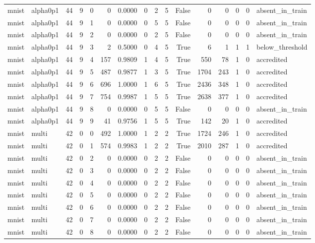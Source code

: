 \begin{tabular}{llrrrrrrrrrrrrrl}
mnist & alpha0p1 & 44 & 9 & 0 & 0 & 0.0000 & 0 & 2 & 5 & False & 0 & 0 & 0 & 0 & absent\_in\_train \\
mnist & alpha0p1 & 44 & 9 & 1 & 0 & 0.0000 & 0 & 5 & 5 & False & 0 & 0 & 0 & 0 & absent\_in\_train \\
mnist & alpha0p1 & 44 & 9 & 2 & 0 & 0.0000 & 0 & 2 & 5 & False & 0 & 0 & 0 & 0 & absent\_in\_train \\
mnist & alpha0p1 & 44 & 9 & 3 & 2 & 0.5000 & 0 & 4 & 5 & True & 6 & 1 & 1 & 1 & below\_threshold \\
mnist & alpha0p1 & 44 & 9 & 4 & 157 & 0.9809 & 1 & 4 & 5 & True & 550 & 78 & 1 & 0 & accredited \\
mnist & alpha0p1 & 44 & 9 & 5 & 487 & 0.9877 & 1 & 3 & 5 & True & 1704 & 243 & 1 & 0 & accredited \\
mnist & alpha0p1 & 44 & 9 & 6 & 696 & 1.0000 & 1 & 6 & 5 & True & 2436 & 348 & 1 & 0 & accredited \\
mnist & alpha0p1 & 44 & 9 & 7 & 754 & 0.9987 & 1 & 5 & 5 & True & 2638 & 377 & 1 & 0 & accredited \\
mnist & alpha0p1 & 44 & 9 & 8 & 0 & 0.0000 & 0 & 5 & 5 & False & 0 & 0 & 0 & 0 & absent\_in\_train \\
mnist & alpha0p1 & 44 & 9 & 9 & 41 & 0.9756 & 1 & 5 & 5 & True & 142 & 20 & 1 & 0 & accredited \\
mnist & multi & 42 & 0 & 0 & 492 & 1.0000 & 1 & 2 & 2 & True & 1724 & 246 & 1 & 0 & accredited \\
mnist & multi & 42 & 0 & 1 & 574 & 0.9983 & 1 & 2 & 2 & True & 2010 & 287 & 1 & 0 & accredited \\
mnist & multi & 42 & 0 & 2 & 0 & 0.0000 & 0 & 2 & 2 & False & 0 & 0 & 0 & 0 & absent\_in\_train \\
mnist & multi & 42 & 0 & 3 & 0 & 0.0000 & 0 & 2 & 2 & False & 0 & 0 & 0 & 0 & absent\_in\_train \\
mnist & multi & 42 & 0 & 4 & 0 & 0.0000 & 0 & 2 & 2 & False & 0 & 0 & 0 & 0 & absent\_in\_train \\
mnist & multi & 42 & 0 & 5 & 0 & 0.0000 & 0 & 2 & 2 & False & 0 & 0 & 0 & 0 & absent\_in\_train \\
mnist & multi & 42 & 0 & 6 & 0 & 0.0000 & 0 & 2 & 2 & False & 0 & 0 & 0 & 0 & absent\_in\_train \\
mnist & multi & 42 & 0 & 7 & 0 & 0.0000 & 0 & 2 & 2 & False & 0 & 0 & 0 & 0 & absent\_in\_train \\
mnist & multi & 42 & 0 & 8 & 0 & 0.0000 & 0 & 2 & 2 & False & 0 & 0 & 0 & 0 & absent\_in\_train \\

\end{tabular}
